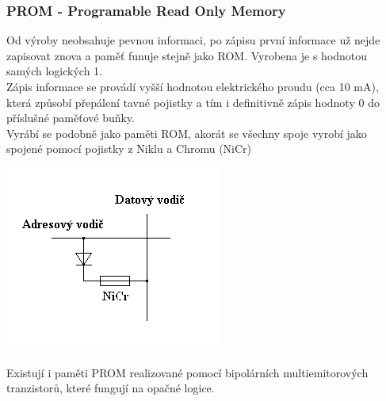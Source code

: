 \subsubsection{PROM - Programable Read Only Memory}
\begin{multicols}{2}
    Od výroby neobsahuje pevnou informaci, po zápisu první informace už nejde zapisovat znova a paměť funuje stejně jako ROM.
    Vyrobena je s hodnotou samých logických 1.\\
    Zápis informace se provádí vyšší hodnotou elektrického proudu (cca 10 mA), která způsobí přepálení tavné pojistky a tím i definitivně zápis hodnoty 0 do příslušné paměťové buňky.\\
    Vyrábí se podobně jako paměti ROM, akorát se všechny spoje vyrobí jako spojené pomocí pojistky z Niklu a Chromu (NiCr)\\
    \columnbreak

    \includegraphics[width=0.7\linewidth]{TVY-POS/Polovodicove-pameti/PROM.png}
\end{multicols}
Existují i paměti PROM realizované pomocí bipolárních multiemitorových tranzistorů, které fungují na opačné logice.
